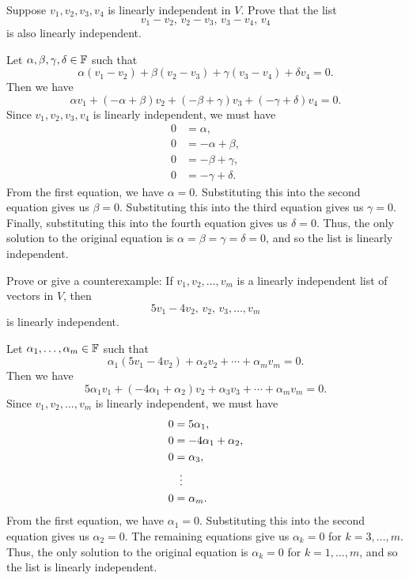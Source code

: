 \begin{exc}
\begin{exercise}
Suppose $v_1,v_2,v_3,v_4$ is linearly independent in $V$. Prove that the list
\[ v_1-v_2,\,v_2-v_3,\,v_3-v_4,\,v_4 \]
is also linearly independent.
\end{exercise}
\begin{solution}
Let $\alpha,\beta,\gamma,\delta\in\mathbb{F}$ such that
\[ \alpha(v_1-v_2)+\beta(v_2-v_3)+\gamma(v_3-v_4)+\delta v_4=0. \]
Then we have
\[ \alpha v_1+(-\alpha+\beta)v_2+(-\beta+\gamma)v_3+(-\gamma+\delta)v_4=0. \]
Since $v_1,v_2,v_3,v_4$ is linearly independent, we must have
\begin{align*}
0 &= \alpha,\\
0 &= -\alpha+\beta,\\
0 &= -\beta+\gamma,\\
0 &= -\gamma+\delta.
\end{align*}
From the first equation, we have $\alpha=0$. Substituting this into the second
equation gives us $\beta=0$. Substituting this into the third equation gives
us $\gamma=0$. Finally, substituting this into the fourth equation gives us
$\delta=0$. Thus, the only solution to the original equation is
$\alpha=\beta=\gamma=\delta=0$, and so the list is linearly independent.
\end{solution}

\begin{exercise}
Prove or give a counterexample: If $v_1,v_2,\dots,v_m$ is a linearly
independent list of vectors in $V$, then
\[ 5v_1-4v_2,\,v_2,\,v_3,\dots,v_m \]
is linearly independent.
\end{exercise}
\begin{solution}
Let $\alpha_1,\dots,\alpha_m\in\mathbb{F}$ such that
\[ \alpha_1(5v_1-4v_2)+\alpha_2v_2+\cdots+\alpha_mv_m=0. \]
Then we have
\[ 5\alpha_1v_1+(-4\alpha_1+\alpha_2)v_2+\alpha_3v_3+\cdots+\alpha_mv_m=0. \]
Since $v_1,v_2,\dots,v_m$ is linearly independent, we must have
\begin{align*}
0 &= 5\alpha_1,\\
0 &= -4\alpha_1+\alpha_2,\\
0 &= \alpha_3,\\
  &\vdotswithin{=}\\
0 &= \alpha_m.
\end{align*}
From the first equation, we have $\alpha_1=0$. Substituting this into the
second equation gives us $\alpha_2=0$. The remaining equations give us
$\alpha_k=0$ for $k=3,\dots,m$. Thus, the only solution to the original
equation is $\alpha_k=0$ for $k=1,\dots,m$, and so the list is linearly
independent.
\end{solution}


\end{exc}
